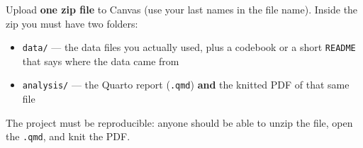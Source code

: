 \documentclass[11pt, a4paper]{article}
\begin{document}
Upload \textbf{one zip file} to Canvas (use your last names in the file name). Inside the zip you must have two folders:

\begin{itemize}
    \item \texttt{data/} --- the data files you actually used, plus a codebook or a short \texttt{README} that says where the data came from
    \item \texttt{analysis/} --- the Quarto report (\texttt{.qmd}) \textbf{and} the knitted PDF of that same file
\end{itemize}

The project must be reproducible: anyone should be able to unzip the file, open the \texttt{.qmd}, and knit the PDF.
\end{document}
